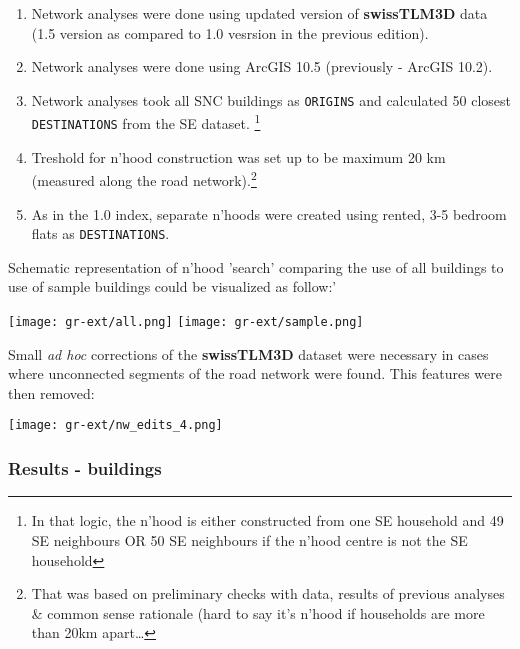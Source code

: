 \documentclass[a4paper, notitlepage, fleqn]{article} %
\begin{document}
{\begin{enumerate}
	\item Network analyses were done using updated version of \textbf{swissTLM3D} data 
		(1.5 version as compared to 1.0 vesrsion in the previous edition).
	
	\item Network analyses were done using ArcGIS 10.5 (previously - ArcGIS 10.2).
	
	\item Network analyses took all SNC buildings as \texttt{ORIGINS} and calculated 
		50 closest \texttt{DESTINATIONS} from the SE dataset.
		\footnote{In that logic, the n'hood is either constructed from one SE household and 49 SE neighbours 
		OR 50 SE neighbours if the n'hood centre is not the SE household}		
	
	\item Treshold for n'hood construction was set up to be maximum 20 km (measured along the road network).\footnote{That was based 
		on preliminary checks with data, results of previous analyses \& common sense rationale (hard to say it's n'hood if households are more than 20km apart\ldots}
	
	\item As in the 1.0 index, separate n'hoods were created using rented, 3-5 bedroom flats as \texttt{DESTINATIONS}. 

\end{enumerate}

Schematic representation of n'hood 'search' comparing the use of all buildings to use of sample buildings could be visualized as follow:'

\begin{center}
\texttt{[image: gr-ext/all.png]}
\texttt{[image: gr-ext/sample.png]} 
\end{center}

Small \textit{ad hoc} corrections of the \textbf{swissTLM3D} dataset were necessary in cases where unconnected segments of the road network were found. This features were then removed: 

\begin{center}
\texttt{[image: gr-ext/nw\_edits\_4.png]}
\end{center}

\subsubsection{Results - buildings}

}
\end{document}
